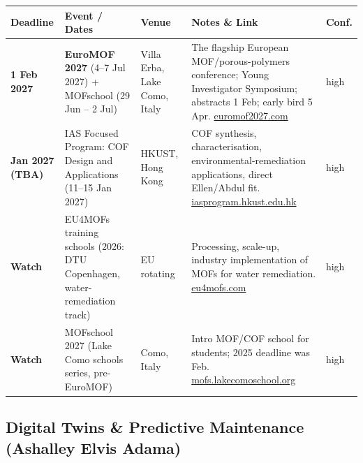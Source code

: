 \documentclass[11pt,a4paper]{article}
\begin{document}
\begin{longtable}{@{}p{3.2cm}p{3.0cm}p{2.5cm}p{5.2cm}p{1.6cm}@{}}
\toprule
\textbf{Deadline} & \textbf{Event / Dates} & \textbf{Venue} & \textbf{Notes \& Link} & \textbf{Conf.} \\
\midrule
\endhead
\textbf{1 Feb 2027} & \textbf{EuroMOF 2027} (4--7 Jul 2027) + MOFschool (29 Jun -- 2 Jul) & Villa Erba, Lake Como, Italy & The flagship European MOF/porous-polymers conference; Young Investigator Symposium; abstracts 1 Feb; early bird 5 Apr. \href{https://euromof2027.com/}{euromof2027.com} & high \\
\midrule
\textbf{Jan 2027 (TBA)} & IAS Focused Program: COF Design and Applications (11--15 Jan 2027) & HKUST, Hong Kong & COF synthesis, characterisation, environmental-remediation applications, direct Ellen/Abdul fit. \href{https://iasprogram.hkust.edu.hk/2027cofda/home.php}{iasprogram.hkust.edu.hk} & high \\
\midrule
\textbf{Watch} & EU4MOFs training schools (2026: DTU Copenhagen, water-remediation track) & EU rotating & Processing, scale-up, industry implementation of MOFs for water remediation. \href{https://eu4mofs.com/}{eu4mofs.com} & high \\
\midrule
\textbf{Watch} & MOFschool 2027 (Lake Como schools series, pre-EuroMOF) & Como, Italy & Intro MOF/COF school for students; 2025 deadline was Feb. \href{https://mofs.lakecomoschool.org/}{mofs.lakecomoschool.org} & high \\
\bottomrule
\end{longtable}

\subsection{Digital Twins \& Predictive Maintenance (Ashalley Elvis Adama)}
\end{document}
